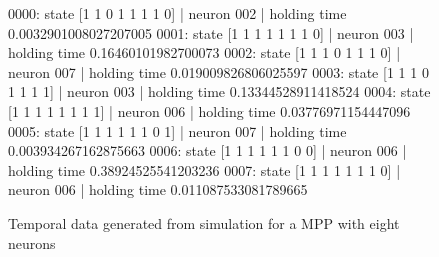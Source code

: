 \begin{figure}[h]
\centering
\begin{python}
0000: state [1 1 0 1 1 1 1 0] | neuron 002 | holding time 0.0032901008027207005
0001: state [1 1 1 1 1 1 1 0] | neuron 003 | holding time 0.16460101982700073
0002: state [1 1 1 0 1 1 1 0] | neuron 007 | holding time 0.019009826806025597
0003: state [1 1 1 0 1 1 1 1] | neuron 003 | holding time 0.13344528911418524
0004: state [1 1 1 1 1 1 1 1] | neuron 006 | holding time 0.03776971154447096
0005: state [1 1 1 1 1 1 0 1] | neuron 007 | holding time 0.003934267162875663
0006: state [1 1 1 1 1 1 0 0] | neuron 006 | holding time 0.38924525541203236
0007: state [1 1 1 1 1 1 1 0] | neuron 006 | holding time 0.011087533081789665
\end{python}
\caption{Temporal data generated from simulation for a MPP with eight neurons}
\end{figure}



%
%
%
%
%
%
%

